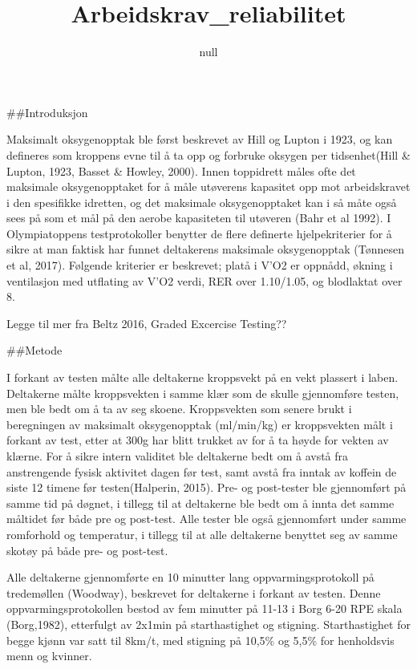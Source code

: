 \documentclass[
]{article}
\title{Arbeidskrav\_reliabilitet}
\author{null}
\date{}
\begin{document}
\maketitle

\#\#Introduksjon

Maksimalt oksygenopptak ble først beskrevet av Hill og Lupton i 1923, og
kan defineres som kroppens evne til å ta opp og forbruke oksygen per
tidsenhet(Hill \& Lupton, 1923, Basset \& Howley, 2000). Innen
toppidrett måles ofte det maksimale oksygenopptaket for å måle utøverens
kapasitet opp mot arbeidskravet i den spesifikke idretten, og det
maksimale oksygenopptaket kan i så måte også sees på som et mål på den
aerobe kapasiteten til utøveren (Bahr et al 1992). I Olympiatoppens
testprotokoller benytter de flere definerte hjelpekriterier for å sikre
at man faktisk har funnet deltakerens maksimale oksygenopptak (Tønnesen
et al, 2017). Følgende kriterier er beskrevet; platå i V'O2 er oppnådd,
økning i ventilasjon med utflating av V'O2 verdi, RER over 1.10/1.05, og
blodlaktat over 8.

Legge til mer fra Beltz 2016, Graded Excercise Testing??

\#\#Metode

I forkant av testen målte alle deltakerne kroppsvekt på en vekt plassert
i laben. Deltakerne målte kroppsvekten i samme klær som de skulle
gjennomføre testen, men ble bedt om å ta av seg skoene. Kroppsvekten som
senere brukt i beregningen av maksimalt oksygenopptak (ml/min/kg) er
kroppsvekten målt i forkant av test, etter at 300g har blitt trukket av
for å ta høyde for vekten av klærne. For å sikre intern validitet ble
deltakerne bedt om å avstå fra anstrengende fysisk aktivitet dagen før
test, samt avstå fra inntak av koffein de siste 12 timene før
testen(Halperin, 2015). Pre- og post-tester ble gjennomført på samme tid
på døgnet, i tillegg til at deltakerne ble bedt om å innta det samme
måltidet før både pre og post-test. Alle tester ble også gjennomført
under samme romforhold og temperatur, i tillegg til at alle deltakerne
benyttet seg av samme skotøy på både pre- og post-test.

Alle deltakerne gjennomførte en 10 minutter lang oppvarmingsprotokoll på
tredemøllen (Woodway), beskrevet for deltakerne i forkant av testen.
Denne oppvarmingsprotokollen bestod av fem minutter på 11-13 i Borg 6-20
RPE skala (Borg,1982), etterfulgt av 2x1min på starthastighet og
stigning. Starthastighet for begge kjønn var satt til 8km/t, med
stigning på 10,5\% og 5,5\% for henholdsvis menn og kvinner.
\end{document}

